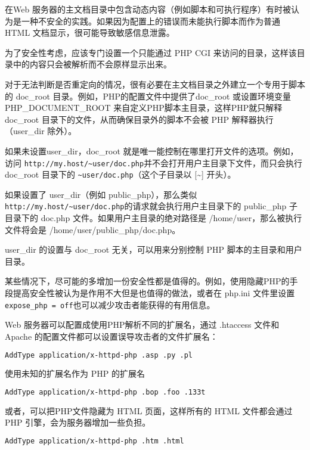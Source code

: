 在Web 服务器的主文档目录中包含动态内容（例如脚本和可执行程序）有时被认为是一种不安全的实践。如果因为配置上的错误而未能执行脚本而作为普通 HTML 文档显示，很可能导致敏感信息泄露。

为了安全性考虑，应该专门设置一个只能通过 PHP CGI 来访问的目录，这样该目录中的内容只会被解析而不会原样显示出来。

对于无法判断是否重定向的情况，很有必要在主文档目录之外建立一个专用于脚本的 doc\_root 目录。例如，PHP的配置文件中提供了doc\_root 或设置环境变量 PHP\_DOCUMENT\_ROOT 来自定义PHP脚本主目录，这样PHP就只解释 doc\_root 目录下的文件，从而确保目录外的脚本不会被 PHP 解释器执行（user\_dir 除外）。

如果未设置user\_dir，doc\_root 就是唯一能控制在哪里打开文件的选项。例如，访问 \texttt{http://my.host/\~{}user/doc.php}并不会打开用户主目录下文件，而只会执行 doc\_root 目录下的 \texttt{\~{}user/doc.php}（这个子目录以 [\~{}] 开头）。



如果设置了 user\_dir（例如 public\_php），那么类似\texttt{http://my.host/\~{}user/doc.php}的请求就会执行用户主目录下的 public\_php 子目录下的 doc.php 文件。如果用户主目录的绝对路径是 /home/user，那么被执行文件将会是 /home/user/public\_php/doc.php。

user\_dir 的设置与 doc\_root 无关，可以用来分别控制 PHP 脚本的主目录和用户目录。

某些情况下，尽可能的多增加一份安全性都是值得的。例如，使用隐藏PHP的手段提高安全性被认为是作用不大但是也值得的做法，或者在 php.ini 文件里设置 \texttt{expose\_php = off}也可以减少攻击者能获得的有用信息。

Web 服务器可以配置成使用PHP解析不同的扩展名，通过 .htaccess 文件和Apache 的配置文件都可以设置误导攻击者的文件扩展名：

\begin{lstlisting}[language=bash]
AddType application/x-httpd-php .asp .py .pl
\end{lstlisting}


\begin{example}
使用未知的扩展名作为 PHP 的扩展名
\begin{lstlisting}[language=bash]
AddType application/x-httpd-php .bop .foo .133t
\end{lstlisting}
\end{example}

或者，可以把PHP文件隐藏为 HTML 页面，这样所有的 HTML 文件都会通过 PHP 引擎，会为服务器增加一些负担。

\begin{lstlisting}[language=bash]
AddType application/x-httpd-php .htm .html
\end{lstlisting}


